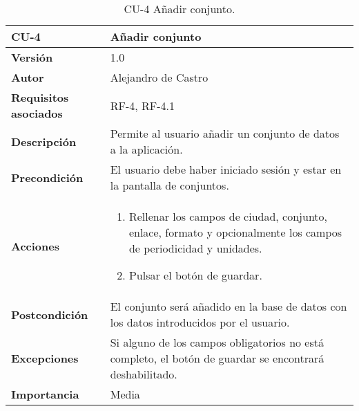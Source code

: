 \begin{table}[p]
	\centering
	\begin{tabularx}{\linewidth}{ p{} p{} }
		\toprule
		\textbf{CU-4}    & \textbf{Añadir conjunto}\\
		\toprule
		\textbf{Versión}              & 1.0    \\
		\textbf{Autor}                & {Alejandro de Castro} \\
		\textbf{Requisitos asociados} & RF-4, RF-4.1 \\
		\textbf{Descripción}          & Permite al usuario añadir un conjunto de datos a la aplicación. \\
		\textbf{Precondición}         & El usuario debe haber iniciado sesión y estar en la pantalla de conjuntos. \\
		\textbf{Acciones}             &
		\begin{enumerate}
			\def\labelenumi{\arabic{enumi}.}
			\tightlist
			\item Rellenar los campos de ciudad, conjunto, enlace, formato y opcionalmente los campos de periodicidad y unidades.
			\item Pulsar el botón de guardar.
		\end{enumerate}\\
		\textbf{Postcondición}        & El conjunto será añadido en la base de datos con los datos introducidos por el usuario. \\
		\textbf{Excepciones}          & Si alguno de los campos obligatorios no está completo, el botón de guardar se encontrará deshabilitado. \\
		\textbf{Importancia}          & Media \\
		\bottomrule
	\end{tabularx}
	\caption{CU-4 Añadir conjunto.}
\end{table}

